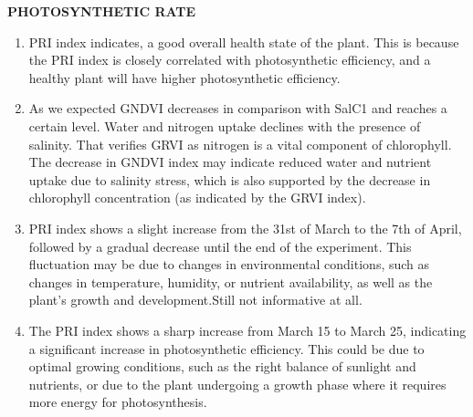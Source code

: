 \documentclass{article}
\begin{document}
                            \textbf{PHOTOSYNTHETIC RATE}
                            \vspace*{1\baselineskip}

                            \begin{enumerate}
                                \item PRI index indicates, a good overall health state of the plant. This is because the PRI index is closely correlated with photosynthetic efficiency, and a healthy plant will have higher photosynthetic efficiency.\par
                                \vspace*{1\baselineskip}
                            
                                \item As we expected GNDVI decreases in comparison with SalC1 and reaches a certain level. Water and nitrogen uptake declines with the presence of salinity. That verifies GRVI as nitrogen is a vital component of chlorophyll. The decrease in GNDVI index may indicate reduced water and nutrient uptake due to salinity stress, which is also supported by the decrease in chlorophyll concentration (as indicated by the GRVI index).\par
                                \vspace*{1\baselineskip}
                    
                                \item PRI index shows a slight increase from the 31st of March to the 7th of April, followed by a gradual decrease until the end of the experiment. This fluctuation may be due to changes in environmental conditions, such as changes in temperature, humidity, or nutrient availability, as well as the plant's growth and development.Still not informative at all.\par
                                \vspace*{1\baselineskip}
                            
                                \item The PRI index shows a sharp increase from March 15 to March 25, indicating a significant increase in photosynthetic efficiency. This could be due to optimal growing conditions, such as the right balance of sunlight and nutrients, or due to the plant undergoing a growth phase where it requires more energy for photosynthesis.\par
                                \vspace*{1\baselineskip}
                                \end{enumerate}
                            
\end{document}
